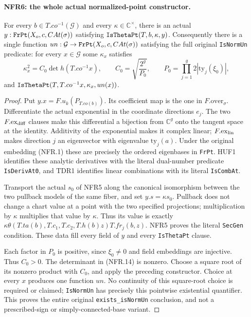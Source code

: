 \documentclass[11pt,a4paper]{article}
\numberwithin{equation}{section}
\theoremstyle{remark}\newtheorem{remark}[theorem]{Remark}
\begin{document}
\paragraph{NFR6: the whole actual normalized-point constructor.}
\label{claim:NFR6}
For every $b\in T.co^{-1}(\mathcal G)$ and every
$\kappa\in\mathbb C^\times$, there is an actual
$y:\texttt{Fr\allowbreak Pt}(X_o,c,CAt(\sigma))$ satisfying
$\texttt{Is\allowbreak Theta\allowbreak Pt}(T,b,\kappa,y)$.
Consequently there is a single function
$un:\mathcal G\to\texttt{Fr\allowbreak Pt}(X_o,c,CAt(\sigma))$
satisfying the full original \texttt{Is\allowbreak Norm\allowbreak Un} predicate:
for every $x\in\mathcal G$ some $\kappa_x$ satisfies
\[
 \kappa_x^2=C_0\det h(T.co^{-1}x),\qquad
 C_0=\sqrt{\frac{2^g}{P_0}},\qquad
 P_0=\prod_{j=1}^g2|\mathrm{ty}_j(\xi_0)|,
 \tag{NFR.14}
\]
and $\texttt{Is\allowbreak Theta\allowbreak Pt}(T,T.co^{-1}x,\kappa_x,un(x))$.

\begin{proof}
Put $y.x=F.u_k(P_{T.co(b)})$.  Its coefficient map is the one in
$F.\mathrm{over}_\sigma$.  Differentiate the actual exponential
in the coordinate directions $e_j$.  The two $F.\mathrm{ex}_{\rm diff}$
clauses make this differential a bijection from $\mathbb C^g$
onto the tangent space at the identity.  Additivity of the
exponential makes it complex linear; $F.\mathrm{ex}_{\rm lin}$
makes direction $j$ an eigenvector with eigenvalue
$\mathrm{ty}_j(a)$.  Under the original embedding (NFR.1) these
are precisely the ordered eigenbases in \texttt{Fr\allowbreak Pt}.
HUF1 identifies these analytic derivatives with the literal
dual-number predicate \texttt{Is\allowbreak Deriv\allowbreak At0}, and TDR1 identifies
linear combinations with its literal \texttt{Is\allowbreak Comb\allowbreak At}.

Transport the actual $s_0$ of NFR5 along the canonical isomorphism
between the two pullback models of the same fiber, and set
$y.s=\kappa s_0$.  Pullback does not change a chart value at a
point with the two specified projections; multiplication by
$\kappa$ multiplies that value by $\kappa$.
Thus its value is exactly
$\kappa\theta(T.ta(b),T.c_1,T.c_2,T.h(b)z)T.fr_j(b,z)$.
NFR5 proves the literal \texttt{Sec\allowbreak Gen} condition.  These data
fill every field of $y$ and every \texttt{Is\allowbreak Theta\allowbreak Pt} clause.

Each factor in $P_0$ is positive, since $\xi_0\ne0$ and field
embeddings are injective.  Thus $C_0>0$.  The determinant in
(NFR.14) is nonzero.  Choose a square root of its nonzero
product with $C_0$, and apply the preceding constructor.
Choice at every $x$ produces one function $un$.
No continuity of this square-root choice is required or claimed;
\texttt{Is\allowbreak Norm\allowbreak Un} has precisely this pointwise existential
quantifier.  This proves the entire original
\texttt{exists\_\allowbreak is\allowbreak Norm\allowbreak Un} conclusion, and not a prescribed-sign
or simply-connected-base variant.
\end{proof}
\end{document}
